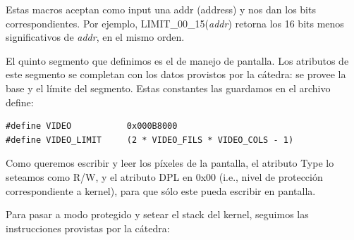 \documentclass[a4paper]{article}
\newenvironment{codesnippet}{%
	\begin{Sbox}\begin{minipage}{\textwidth}\sffamily\small}%
	{\end{minipage}\end{Sbox}%
		\begin{center}%
		\vspace{-0.4cm}\colorbox{litegrey}{\TheSbox}\end{center}\vspace{0.3cm}}
\begin{document}
Estas macros aceptan como input una addr (address) y nos dan los bits correspondientes. Por ejemplo,
LIMIT\_00\_15(\textit{addr}) retorna los 16 bits menos significativos de \textit{addr}, en el mismo orden.

El quinto segmento que definimos es el de manejo de pantalla. Los atributos de este segmento se completan con los datos
provistos por la cátedra: se provee la base y el límite del segmento. Estas constantes las guardamos en el archivo
define:

\begin{codesnippet}
  \begin{verbatim}
#define VIDEO           0x000B8000
#define VIDEO_LIMIT     (2 * VIDEO_FILS * VIDEO_COLS - 1)
  \end{verbatim}
\end{codesnippet}

Como queremos escribir y leer los píxeles de la pantalla, el atributo Type lo seteamos como R/W, y el atributo DPL en
0x00 (i.e., nivel de protección correspondiente a kernel), para que sólo este pueda escribir en pantalla.

Para pasar a modo protegido y setear el stack del kernel, seguimos las instrucciones provistas por la cátedra:
\end{document}
